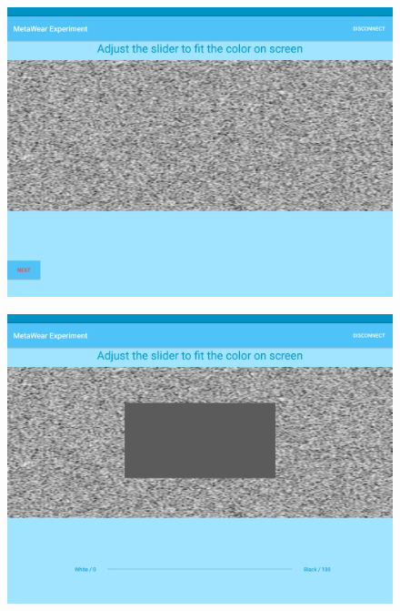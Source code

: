 \begin{figure}[h!]
\centering
\begin{minipage}{.55\textwidth}
  \centering
  \includegraphics[width=0.95\linewidth]{figures/tablet_screen9.png}
  \label{app_next_stim}
\end{minipage}%
\begin{minipage}{.55\textwidth}
  \centering
  \includegraphics[width=0.95\linewidth]{figures/tablet_screen10.png}
  \label{app_repeat}
\end{minipage}
\end{figure}

